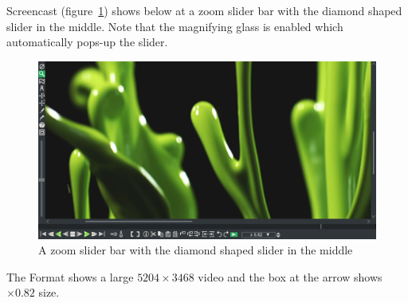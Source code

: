 Screencast (figure~\ref{fig:zoom_slider}) shows below at a zoom slider bar with the diamond shaped slider in the middle.  Note 
that the magnifying glass is  enabled which automatically pops-up the slider.

\begin{figure}[htpb]
    \centering
    \includegraphics[width=0.99\linewidth]{images/zoom_slider.png}
    \caption{A zoom slider bar with the diamond shaped slider in the middle}
    \label{fig:zoom_slider}
\end{figure}
The Format shows a large $5204\times3468$ video and the box at the arrow shows $\times0.82$ size.  

